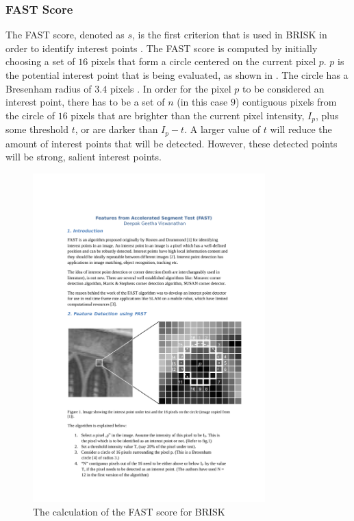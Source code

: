 \documentclass{report}
\begin{document}
\subsubsection{FAST Score}
\label{sec:fastScore}

The FAST score, denoted as $s$, is the first criterion that is used in BRISK in order to identify interest points \cite{Rosten2006}. The FAST score is computed by initially choosing a set of $16$ pixels that form a circle centered on the current pixel $p$. $p$ is the potential interest point that is being evaluated, as shown in  \cite{Rosten2006}. The circle has a Bresenham radius of $3.4$ pixels \cite{Mair2010}. In order for the pixel $p$ to be considered an interest point, there has to be a set of $n$ (in this case $9$) contiguous pixels from the circle of $16$ pixels that are brighter than the current pixel intensity, $I_p$, plus some threshold $t$, or are darker than $I_p - t$. A larger value of $t$ will reduce the amount of interest points that will be detected. However, these detected points will be strong, salient interest points. \\

\begin{figure}[h!] 
  \centering
    \includegraphics[width=0.8\textwidth]{../Drawings/methods/FASTScoreCalculation.pdf}
    \caption{The calculation of the FAST score for BRISK}
    \label{fig:fastScore}
\end{figure}
\end{document}
